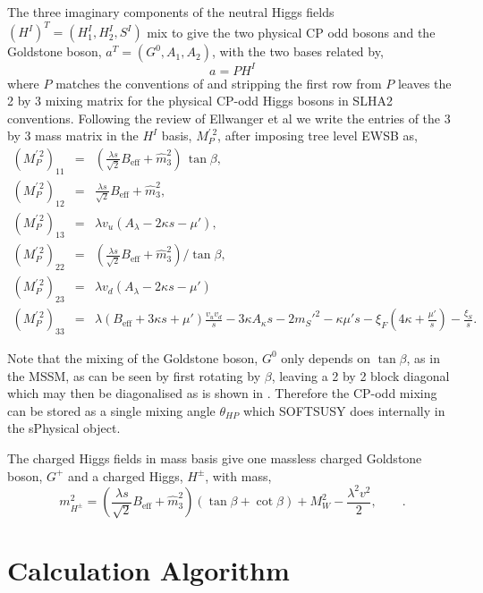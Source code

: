 \documentclass[final,3p,times,pdflatex]{elsarticle}
\newcommand{\be}{\begin{equation}}
\newcommand{\ee}{\end{equation}}
\newcommand{\ba}{\begin{eqnarray}}
\newcommand{\ea}{\end{eqnarray}}
\newcommand{\ds}{\displaystyle}
\begin{document}
The three imaginary components of the neutral Higgs fields $(H^I)^T = (H^I_1, H_2^I, S^I)$ mix to give the two physical CP odd bosons and the Goldstone boson, $a^T = (G^0, A_1, A_2)$, with the two bases related by,
 \be a = P H^I \ee where $P$ matches the conventions of \cite{Degrassi:2009yq} and stripping the first row from $P$ leaves the 2 by 3 mixing matrix for the physical CP-odd Higgs bosons in SLHA2 conventions\cite{Allanach:2008qq}. Following the review of Ellwanger et al \cite{Ellwanger:2009dp} we write the entries of the 3 by 3 mass matrix in the $H^I$ basis, $ M^{\prime \, 2}_{P}$, after imposing tree level EWSB as,
\ba
( M^{\prime \, 2}_{P})_{11} & = & (\ds\frac{\lambda s}{\sqrt{2}} B_\textrm{eff} +
\widehat{m}_3^2)\,\tan\beta , \\
( M^{\prime \, 2}_{P})_{12} & = & \ds\frac{\lambda s}{\sqrt{2}} B_\textrm{eff} +
\widehat{m}_3^2, \\
( M^{\prime \, 2}_{P})_{13} & = & \lambda v_u (A_\lambda - 2\kappa s - \mu'), \\
( M^{\prime \, 2}_{P})_{22} & = & (\ds\frac{\lambda s}{\sqrt{2}} B_\textrm{eff} +
\widehat{m}_3^2)/\tan\beta ,  \\
( M^{\prime \, 2}_{P})_{23} & = & \lambda v_d (A_\lambda - 2\kappa s - \mu')\\
( M^{\prime \, 2}_{P})_{33} & = & \lambda (B_\textrm{eff}+3\kappa s +\mu')\ds\frac{v_u
v_d}{s} -3\kappa A_\kappa s  -2 m_{S}'^2 -\kappa \mu' s 
-\xi_F\left(4\kappa + \frac{\mu'}{s}\right) -\ds\frac{\xi_S}{s}.
\label{eq:MA0}
\ea

Note that the mixing of the Goldstone boson, $G^0$ only depends on $\tan\beta$, as in the MSSM, as can be seen by first rotating by $\beta$, leaving a 2 by 2 block diagonal which may then be diagonalised as is shown in \cite{Ellwanger:2009dp}.  Therefore the CP-odd mixing can be stored as a single mixing angle $\theta_{HP}$ which SOFTSUSY does internally in the sPhysical object.


The charged Higgs fields in mass basis give one massless charged Goldstone boson, $G^+$ and a charged Higgs, $H^\pm$, with mass,
\be m_{H^\pm}^2 = \left(\ds\frac{\lambda s}{\sqrt{2}} B_\textrm{eff} +
\widehat{m}_3^2\right)(\tan \beta + \cot \beta) + M_W^2 - \ds\frac{\lambda^2 v^2}{2},\qquad. \ee
  
\section{Calculation Algorithm \label{sec:calculation}}
\end{document}
